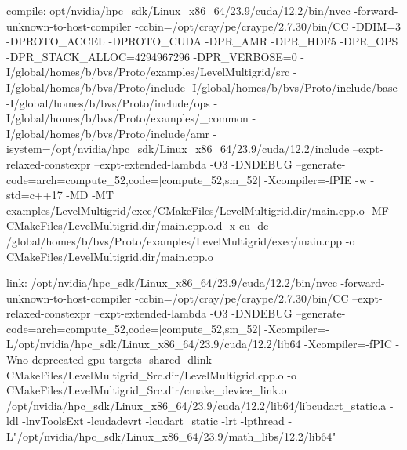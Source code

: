 compile:
opt/nvidia/hpc_sdk/Linux_x86_64/23.9/cuda/12.2/bin/nvcc
-forward-unknown-to-host-compiler
-ccbin=/opt/cray/pe/craype/2.7.30/bin/CC -DDIM=3 -DPROTO_ACCEL
-DPROTO_CUDA -DPR_AMR -DPR_HDF5 -DPR_OPS -DPR_STACK_ALLOC=4294967296
-DPR_VERBOSE=0 -I/global/homes/b/bvs/Proto/examples/LevelMultigrid/src
-I/global/homes/b/bvs/Proto/include
-I/global/homes/b/bvs/Proto/include/base
-I/global/homes/b/bvs/Proto/include/ops
-I/global/homes/b/bvs/Proto/examples/_common
-I/global/homes/b/bvs/Proto/include/amr
-isystem=/opt/nvidia/hpc_sdk/Linux_x86_64/23.9/cuda/12.2/include
--expt-relaxed-constexpr --expt-extended-lambda -O3 -DNDEBUG
--generate-code=arch=compute_52,code=[compute_52,sm_52]
-Xcompiler=-fPIE -w -std=c++17 -MD -MT
examples/LevelMultigrid/exec/CMakeFiles/LevelMultigrid.dir/main.cpp.o -MF CMakeFiles/LevelMultigrid.dir/main.cpp.o.d -x cu -dc /global/homes/b/bvs/Proto/examples/LevelMultigrid/exec/main.cpp -o CMakeFiles/LevelMultigrid.dir/main.cpp.o



link:
/opt/nvidia/hpc_sdk/Linux_x86_64/23.9/cuda/12.2/bin/nvcc
-forward-unknown-to-host-compiler
-ccbin=/opt/cray/pe/craype/2.7.30/bin/CC  --expt-relaxed-constexpr
--expt-extended-lambda -O3 -DNDEBUG
--generate-code=arch=compute_52,code=[compute_52,sm_52]
-Xcompiler=-L/opt/nvidia/hpc_sdk/Linux_x86_64/23.9/cuda/12.2/lib64
-Xcompiler=-fPIC -Wno-deprecated-gpu-targets -shared -dlink
CMakeFiles/LevelMultigrid_Src.dir/LevelMultigrid.cpp.o -o
CMakeFiles/LevelMultigrid_Src.dir/cmake_device_link.o
/opt/nvidia/hpc_sdk/Linux_x86_64/23.9/cuda/12.2/lib64/libcudart_static.a
-ldl  -lnvToolsExt -lcudadevrt -lcudart_static -lrt -lpthread
-L"/opt/nvidia/hpc_sdk/Linux_x86_64/23.9/math_libs/12.2/lib64"

